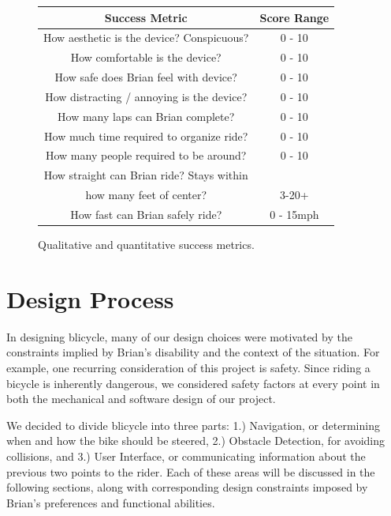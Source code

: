 \documentclass[aps,twocolumn,secnumarabic,balancelastpage,amsmath,amssymb,nofootinbib]{revtex4-1}
\begin{document}
\begin{figure}
\begin{tabular}{| c | c |}
\hline
Success Metric & Score Range \\ \hline \hline
How aesthetic is the device? Conspicuous? & 0 - 10 \\ \hline
How comfortable is the device? & 0 - 10 \\ \hline
How safe does Brian feel with device? & 0 - 10 \\ \hline
How distracting / annoying is the device? & 0 - 10 \\ \hline \hline
How many laps can Brian complete? & 0 - 10 \\ \hline
How much time required to organize ride? & 0 - 10 \\ \hline
How many people required to be around? & 0 - 10 \\ \hline
How straight can Brian ride? Stays within \\ how many feet of center? & 3-20+ \\ \hline
How fast can Brian safely ride? & 0 - 15mph \\ \hline
\end{tabular}
\caption{Qualitative and quantitative success metrics.}
\label{fig:SuccessMetrics}
\end{figure}


\section{Design Process}
In designing blicycle, many of our design choices were motivated by the constraints implied by Brian's disability and the context of the situation. For example, one recurring consideration of this project is safety. Since riding a bicycle is inherently dangerous, we considered safety factors at every point in both the mechanical and software design of our project.

We decided to divide blicycle into three parts: 1.) Navigation, or determining when and how the bike should be steered, 2.) Obstacle Detection, for avoiding collisions, and 3.) User Interface, or communicating information about the previous two points to the rider. Each of these areas will be discussed in the following sections, along with corresponding design constraints imposed by Brian's preferences and functional abilities.
\end{document}
